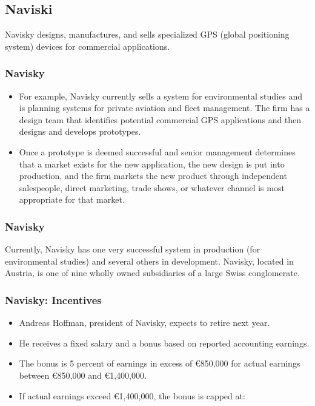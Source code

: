 \hypertarget{naviski}{%
\subsection{Naviski}\label{naviski}}

Navisky designs, manufactures, and sells specialized GPS (global
positioning system) devices for commercial applications.

\hypertarget{navisky}{%
\subsubsection{Navisky}\label{navisky}}

\begin{itemize}
\tightlist
\item
  For example, Navisky currently sells a system for environmental
  studies and is planning systems for private aviation and fleet
  management. The firm has a design team that identifies potential
  commercial GPS applications and then designs and develops prototypes.
\item
  Once a prototype is deemed successful and senior management determines
  that a market exists for the new application, the new design is put
  into production, and the firm markets the new product through
  independent salespeople, direct marketing, trade shows, or whatever
  channel is most appropriate for that market.
\end{itemize}

\hypertarget{navisky-1}{%
\subsubsection{Navisky}\label{navisky-1}}

Currently, Navisky has one very successful system in production (for
environmental studies) and several others in development. Navisky,
located in Austria, is one of nine wholly owned subsidiaries of a large
Swiss conglomerate.

\hypertarget{navisky-incentives}{%
\subsubsection{Navisky: Incentives}\label{navisky-incentives}}

\begin{itemize}
\tightlist
\item
  Andreas Hoffman, president of Navisky, expects to retire next year.
\item
  He receives a fixed salary and a bonus based on reported accounting
  earnings.
\item
  The bonus is 5 percent of earnings in excess of €850,000 for actual
  earnings between €850,000 and €1,400,000.
\item
  If actual earnings exceed €1,400,000, the bonus is capped at:
\end{itemize}

